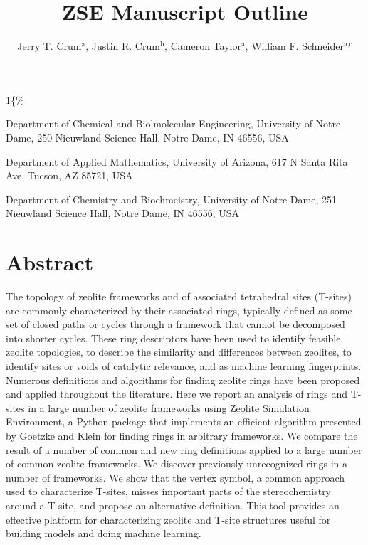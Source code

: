 \documentclass[11pt]{article}
\author{Jerry T. Crum\(^{\text{a}}\), Justin R. Crum\(^{\text{b}}\), Cameron Taylor\(^{\text{a}}\), William F. Schneider\(^{\text{a,c}}\)}
\date{}
\title{ZSE Manuscript Outline}
\begin{document}
\begin{OPTIONS}
\def\udesoftecoverride\#1\mainmatter\{\%
  \AfterEndPreamble{#1\mainmatter}
\end{OPTIONS}

\maketitle

\begin{asparaenum}[\expandafter\textsuperscript a ]
\item Department of Chemical and Biolmolecular Engineering, University of Notre Dame, 250 Nieuwland Science Hall, Notre Dame, IN 46556, USA \\
\item Department of Applied Mathematics, University of Arizona, 617 N Santa Rita Ave, Tucson, AZ 85721, USA\\
\item Department of Chemistry and Biochmeistry, University of Notre Dame, 251 Nieuwland Science Hall, Notre Dame, IN 46556, USA
\end{asparaenum}

\newpage
\section{Abstract}
\label{sec:org598be1c}
The topology of zeolite frameworks and of associated tetrahedral sites (T-sites) are commonly characterized by their associated rings, typically defined as some set of closed paths or cycles through a framework that cannot be decomposed into shorter cycles. These ring descriptors have been used to identify feasible zeolite topologies, to describe the similarity and differences between zeolites, to identify sites or voids of catalytic relevance, and as machine learning fingerprints. Numerous definitions and algorithms for finding zeolite rings have been proposed and applied throughout the literature. Here we report an analysis of rings and T-sites in a large number of zeolite frameworks using Zeolite Simulation Environment, a Python package that implements an efficient algorithm presented by Goetzke and Klein for finding rings in arbitrary frameworks. We compare the result of a number of common and new ring definitions applied to a large number of common zeolite frameworks. We discover previously unrecognized rings in a number of frameworks. We show that the vertex symbol, a common approach used to characterize T-sites, misses important parts of the stereochemistry around a T-site, and propose an alternative definition. This tool provides an effective platform for characterizing zeolite and T-site structures useful for building models and doing machine learning. 
\end{document}
